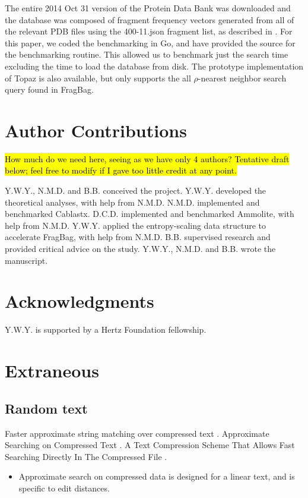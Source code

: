 \documentclass[review,preprint,12pt]{elsarticle}
\renewcommand{\cite}{\citep} %
\theoremstyle{definition}
\theoremstyle{remark}
\numberwithin{equation}{section}
\begin{document}
The entire 2014 Oct 31 version of the Protein Data Bank was downloaded and the database was composed of fragment frequency vectors generated from all of the relevant PDB files using the 400-11.json fragment list, as described in \citep{budwoski2010fragbag}.
For this paper, we coded the benchmarking in Go, and have provided the source for the benchmarking routine.
This allowed us to benchmark just the search time excluding the time to load the database from disk.
The prototype implementation of Topaz is also available, but only supports the all $\rho$-nearest neighbor search query found in FragBag.

\section{Author Contributions}
\hl{How much do we need here, seeing as we have only 4 authors? Tentative draft below; feel free to modify if I gave too little credit at any point.}

Y.W.Y., N.M.D. and B.B. conceived the project.
Y.W.Y. developed the theoretical analyses, with help from N.M.D.
N.M.D. implemented and benchmarked Cablastx.
D.C.D. implemented and benchmarked Ammolite, with help from N.M.D.
Y.W.Y. applied the entropy-scaling data structure to accelerate FragBag, with help from N.M.D.
B.B. supervised research and provided critical advice on the study.
Y.W.Y., N.M.D. and B.B. wrote the manuscript.

\section{Acknowledgments}
Y.W.Y. is supported by a Hertz Foundation fellowship.


%


\newpage

\appendix
\section{Extraneous}
\subsection{Random text}

Faster approximate string matching over compressed text \cite{navarro2001faster}.
Approximate Searching on Compressed Text \cite{perez2005approximate}.
A Text Compression Scheme That Allows Fast Searching Directly In The Compressed File \cite{manber93atext}.
\begin{itemize}
\item Approximate search on compressed data is designed for a linear text, and is specific to edit distances.
\end{itemize}
\end{document}
